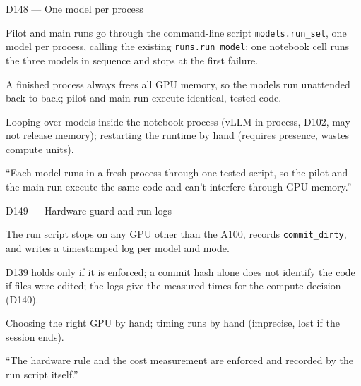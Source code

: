 \documentclass[11pt,a4paper]{report}
\begin{document}
\begin{decisionbox}{D148 --- One model per process}
\begin{description}[nosep, leftmargin=0pt]
  \item[Decision.] Pilot and main runs go through the command-line script \texttt{models.run\_set}, one model per process, calling the existing \texttt{runs.run\_model}; one notebook cell runs the three models in sequence and stops at the first failure.
  \item[Why.] A finished process always frees all GPU memory, so the models run unattended back to back; pilot and main run execute identical, tested code.
  \item[Alternatives.] Looping over models inside the notebook process (vLLM in-process, D102, may not release memory); restarting the runtime by hand (requires presence, wastes compute units).
  \item[Interview line.] ``Each model runs in a fresh process through one tested script, so the pilot and the main run execute the same code and can't interfere through GPU memory.''
\end{description}
\end{decisionbox}

\begin{decisionbox}{D149 --- Hardware guard and run logs}
\begin{description}[nosep, leftmargin=0pt]
  \item[Decision.] The run script stops on any GPU other than the A100, records \texttt{commit\_dirty}, and writes a timestamped log per model and mode.
  \item[Why.] D139 holds only if it is enforced; a commit hash alone does not identify the code if files were edited; the logs give the measured times for the compute decision (D140).
  \item[Alternatives.] Choosing the right GPU by hand; timing runs by hand (imprecise, lost if the session ends).
  \item[Interview line.] ``The hardware rule and the cost measurement are enforced and recorded by the run script itself.''
\end{description}
\end{decisionbox}
\end{document}
